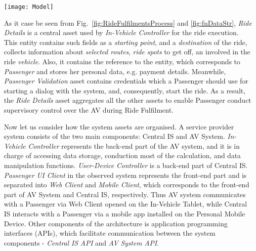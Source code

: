 \documentclass[manuscript]{acmart}
\begin{document}
\begin{figure*} [ht]
    \centering
    \texttt{[image: Model]}
    \caption[Data structure of the system]{Data structure of the system~\cite{PassengerDataProtection} (green entities - business assets; red entities - system assets)} \label{fig:fnDataStr}
\end{figure*}

As it case be seen from Fig.~\ref{fig:RideFulfilmentsProcess} and \ref{fig:fnDataStr}, \textit{Ride Details} is a central asset used by \textit{In-Vehicle Controller} for the ride execution. This entity contains such fields as a \textit{starting point}, and a \textit{destination} of the ride, collects information about \textit{selected routes}, \textit{ride spots} to get off, an involved in the ride \textit{vehicle}. Also, it contains the reference to the entity, which corresponds to \textit{Passenger} and stores her personal data, e.g. payment details. Meanwhile, \textit{Passenger Validation} asset contains credentials which a Passenger should use for starting a dialog with the system, and, consequently, start the ride. As a result, the \textit{Ride Details} asset aggregates all the other assets to enable Passenger conduct supervisory control over the AV during Ride Fulfilment.

Now let us consider how the system assets are organised. A service provider system consists of the two main components: Central IS and AV System.  \textit{In-Vehicle Controller} represents the back-end part of the AV system, and it is in charge of accessing data storage, conduction most of the calculation, and data manipulation functions. \textit{User-Device Controller} is a back-end part of Central IS. \textit{Passenger UI Client} in the observed system represents the front-end part and is separated into \textit{Web Client} and \textit{Mobile Client}, which corresponds to the front-end part of AV System and Central IS, respectively. Thus AV system communicates with a Passenger via Web Client opened on the In-Vehicle Tablet, while Central IS interacts with a Passenger via a mobile app installed on the Personal Mobile Device. Other components of the architecture is application programming interfaces (APIs), which facilitate communication between the system components - \textit{Central IS API} and \textit{AV System API}. 
\end{document}
